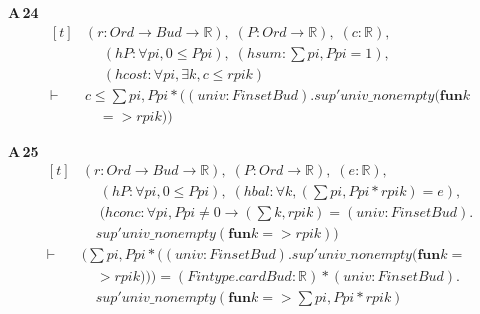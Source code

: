\noindent\textbf{A\,24}\quad{}
{\footnotesize\[ \begin{aligned}[t]
&(\mathit{r} : \mathit{Ord} \to \mathit{Bud} \to \mathbb{R} ),\; (\mathit{P} : \mathit{Ord} \to \mathbb{R} ),\; (\mathit{c} : \mathbb{R} ),\\
&\quad \; (\mathit{hP} : \forall \mathit{pi}, 0 \leq \mathit{P} \mathit{pi}),\; (\mathit{hsum} : \textstyle\sum \mathit{pi}, \mathit{P} \mathit{pi} = 1),\\
&\quad \; (\mathit{hcost} : \forall \mathit{pi}, \exists \mathit{k}, \mathit{c} \leq \mathit{r} \mathit{pi} \mathit{k})\\
\vdash\;&\mathit{c} \leq \textstyle\sum \mathit{pi}, \mathit{P} \mathit{pi} * ((\mathit{univ} : \mathit{Finset} \mathit{Bud}).\mathit{sup'} \mathit{univ\_nonempty} (\mathbf{fun} \mathit{k}\\
&\quad => \mathit{r} \mathit{pi} \mathit{k}))
\end{aligned} \]}

\noindent\textbf{A\,25}\quad{}
{\footnotesize\[ \begin{aligned}[t]
&(\mathit{r} : \mathit{Ord} \to \mathit{Bud} \to \mathbb{R} ),\; (\mathit{P} : \mathit{Ord} \to \mathbb{R} ),\; (\mathit{e} : \mathbb{R} ),\\
&\quad \; (\mathit{hP} : \forall \mathit{pi}, 0 \leq \mathit{P} \mathit{pi}),\; (\mathit{hbal} : \forall \mathit{k}, (\textstyle\sum \mathit{pi}, \mathit{P} \mathit{pi} * \mathit{r} \mathit{pi} \mathit{k}) = \mathit{e}),\\
&\quad \; (\mathit{hconc} : \forall \mathit{pi}, \mathit{P} \mathit{pi} \neq 0 \to (\textstyle\sum \mathit{k}, \mathit{r} \mathit{pi} \mathit{k}) = (\mathit{univ} : \mathit{Finset} \mathit{Bud}).\\
&\quad \mathit{sup'} \mathit{univ\_nonempty} (\mathbf{fun} \mathit{k} => \mathit{r} \mathit{pi} \mathit{k}))\\
\vdash\;&(\textstyle\sum \mathit{pi}, \mathit{P} \mathit{pi} * ((\mathit{univ} : \mathit{Finset} \mathit{Bud}).\mathit{sup'} \mathit{univ\_nonempty} (\mathbf{fun} \mathit{k} =\\
&\quad > \mathit{r} \mathit{pi} \mathit{k}))) = (\mathit{Fintype}.\mathit{card} \mathit{Bud} : \mathbb{R} ) * (\mathit{univ} : \mathit{Finset} \mathit{Bud}).\\
&\quad \mathit{sup'} \mathit{univ\_nonempty} (\mathbf{fun} \mathit{k} => \textstyle\sum \mathit{pi}, \mathit{P} \mathit{pi} * \mathit{r} \mathit{pi} \mathit{k})
\end{aligned} \]}

